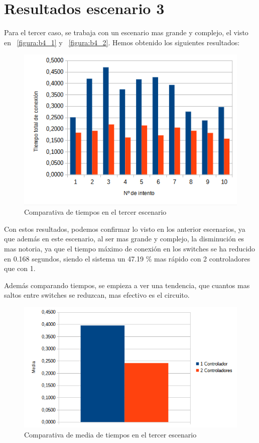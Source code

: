 \documentclass[a4paper, 12pt]{book}
\begin{document}
	\section{Resultados escenario 3} 
	\label{sec:resultEsc3}
	
	
	Para el tercer caso, se trabaja con un escenario mas grande y complejo, el visto en ~\ref{figura:b4_1} y ~\ref{figura:b4_2}. Hemos obtenido los siguientes resultados:
	
	\begin{figure}[H]
		\centering
		\includegraphics[width=16cm, keepaspectratio]{img/comparativaescenario3}
		\caption{Comparativa de tiempos en el tercer escenario}
		\label{figura:comparativab4}
	\end{figure}
	
	Con estos resultados, podemos confirmar lo visto en los anterior escenarios, ya que además en este escenario, al ser mas grande y complejo, la disminución es mas notoria, ya que el tiempo máximo de conexión en los switches se ha reducido en 0.168 segundos, siendo el sistema un 47.19 \% mas rápido con 2 controladores que con 1.
	
	Además comparando tiempos, se empieza a ver una tendencia, que cuantos mas saltos entre switches se reduzcan, mas efectivo es el circuito.
	
	\begin{figure}[H]
		\centering
		\includegraphics[width=16cm, keepaspectratio]{img/comparativamediaescenario3}
		\caption{Comparativa de media de tiempos en el tercer escenario}
		\label{figura:mediab4}
	\end{figure}
	
\end{document}

